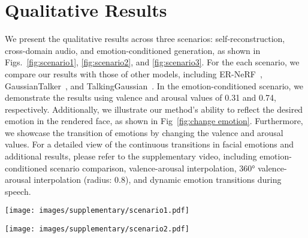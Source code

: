 \section{Qualitative Results}
We present the qualitative results across three scenarios: self-reconstruction, cross-domain audio, and emotion-conditioned generation, as shown in Figs.~\ref{fig:scenario1}, \ref{fig:scenario2}, and \ref{fig:scenario3}. For the each scenario, we compare our results with those of other models, including ER-NeRF~\cite{li2023efficient}, GaussianTalker~\cite{cho2024gaussiantalker}, and TalkingGaussian~\cite{li2024talkinggaussian}. In the emotion-conditioned scenario, we demonstrate the results using valence and arousal values of 0.31 and 0.74, respectively. Additionally, we illustrate our method's ability to reflect the desired emotion in the rendered face, as shown in Fig~\ref{fig:change emotion}. Furthermore, we showcase the transition of emotions by changing the valence and arousal values. For a detailed view of the continuous transitions in facial emotions and additional results, please refer to the supplementary video, including emotion-conditioned scenario comparison, valence-arousal interpolation, 360° valence-arousal interpolation (radius: 0.8), and dynamic emotion transitions during speech.

\begin{figure*}[t]
    \centering
    \texttt{[image: images/supplementary/scenario1.pdf]}
    \caption{We present the qualitative comparisons in the self-reconstruction scenario against other methods, including ER-NeRF~\cite{li2023efficient}, GaussianTalker~\cite{cho2024gaussiantalker}, and TalkingGaussian~\cite{li2024talkinggaussian}. Misalignment with the ground truth is highlighted using \textcolor{gray}{gray} arrows for discrepancies in the eyebrows and forehead wrinkles, \textcolor{blue}{blue} arrows for blinking errors, and \textcolor{red}{red} boxes for lip misalignment.}
    \label{fig:scenario1}
\end{figure*}

\begin{figure*}[t]
    \centering
    \texttt{[image: images/supplementary/scenario2.pdf]}
    \caption{We present qualitative comparisons in the cross-domain audio scenario against other methods, including ER-NeRF~\cite{li2023efficient}, GaussianTalker~\cite{cho2024gaussiantalker}, and TalkingGaussian~\cite{li2024talkinggaussian}. Lip misalignment with the ground truth is highlighted using \textcolor{red}{red} boxes.}
    \label{fig:scenario2}
\end{figure*}

